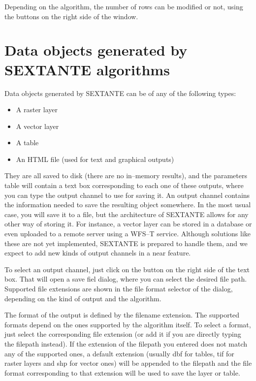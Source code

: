 \begin{itemize}
Depending on the algorithm, the number of rows can be modified or not, using the buttons on the right side of the window.

\end{itemize}

\section{Data objects generated by SEXTANTE algorithms}

Data objects generated by SEXTANTE can be of any of the following types:

\begin{itemize}
 \item A raster layer
\item A vector layer
\item A table
\item An HTML file (used for text and graphical outputs)
\end{itemize}

They are all saved to disk (there are no in--memory results), and the parameters table will contain a text box corresponding to each one of these outputs, where you can type the output channel to use for saving it. An output channel contains the information needed to save the resulting object somewhere. In the most usual case, you will save it to a file, but the architecture of SEXTANTE allows for any other way of storing it. For instance, a vector layer can be stored in a database or even uploaded to a remote server using a WFS--T service. Although solutions like these are not yet implemented, SEXTANTE is prepared to handle them, and we expect to add new kinds of output channels in a near feature.




To select an output channel, just click on the button on the right side of the text box. That will open a save fiel dialog, where you can select the desired file path. Supported file extensions are shown in the file format selector of the dialog, depending on the kind of output and the algorithm.

The format of the output is defined by the filename extension. The supported formats depend on the ones supported by the algorithm itself. To select a format, just select the corresponding file extension (or add it if you are directly typing the filepath instead). If the extension of the filepath you entered does not match any of the supported ones, a default extension (usually dbf for tables, tif for raster layers and shp for vector ones) will be appended to the filepath and the file format corresponding to that extension will be used to save the layer or table.

